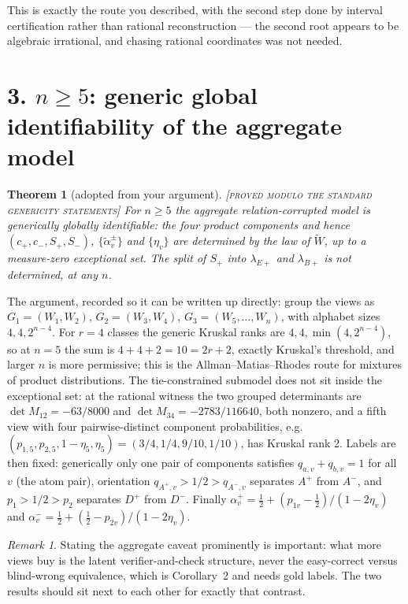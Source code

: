 \documentclass[11pt]{article}
\newtheorem{theorem}{Theorem}
\theoremstyle{remark}
\newtheorem*{remark}{Remark}
\newcommand{\status}[1]{\hfill{\normalfont\small\textsc{[#1]}}}
\newcommand{\Wt}{\widetilde{W}}
\begin{document}
This is exactly the route you described, with the second step done by interval certification rather than rational reconstruction --- the second root appears to be algebraic irrational, and chasing rational coordinates was not needed.

\section*{3. $n\ge5$: generic global identifiability of the aggregate model}

\begin{theorem}[adopted from your argument]\status{proved modulo the standard genericity statements}
For $n\ge5$ the aggregate relation-corrupted model is generically globally identifiable: the four product components and hence $(c_+,c_-,S_+,S_-)$, $\{\tilde\alpha^{\pm}_v\}$ and $\{\eta_v\}$ are determined by the law of $\Wt$, up to a measure-zero exceptional set. The split of $S_+$ into $\lambda_{E+}$ and $\lambda_{B+}$ is \emph{not} determined, at any $n$.
\end{theorem}

The argument, recorded so it can be written up directly: group the views as $G_1=(W_1,W_2)$, $G_2=(W_3,W_4)$, $G_3=(W_5,\dots,W_n)$, with alphabet sizes $4,4,2^{n-4}$. For $r=4$ classes the generic Kruskal ranks are $4,4,\min(4,2^{n-4})$, so at $n=5$ the sum is $4+4+2=10=2r+2$, exactly Kruskal's threshold, and larger $n$ is more permissive; this is the Allman--Matias--Rhodes route for mixtures of product distributions. The tie-constrained submodel does not sit inside the exceptional set: at the rational witness the two grouped determinants are $\det M_{12}=-63/8000$ and $\det M_{34}=-2783/116640$, both nonzero, and a fifth view with four pairwise-distinct component probabilities, e.g.\ $(p_{1,5},p_{2,5},1-\eta_5,\eta_5)=(3/4,1/4,9/10,1/10)$, has Kruskal rank 2. Labels are then fixed: generically only one pair of components satisfies $q_{a,v}+q_{b,v}=1$ for all $v$ (the atom pair), orientation $q_{A^+,v}>1/2>q_{A^-,v}$ separates $A^+$ from $A^-$, and $p_1>1/2>p_2$ separates $D^+$ from $D^-$. Finally $\alpha^+_v=\tfrac12+(p_{1v}-\tfrac12)/(1-2\eta_v)$ and $\alpha^-_v=\tfrac12+(\tfrac12-p_{2v})/(1-2\eta_v)$.

\begin{remark}
Stating the aggregate caveat prominently is important: what more views buy is the latent verifier-and-check structure, never the easy-correct versus blind-wrong equivalence, which is Corollary~2 and needs gold labels. The two results should sit next to each other for exactly that contrast.
\end{remark}
\end{document}
